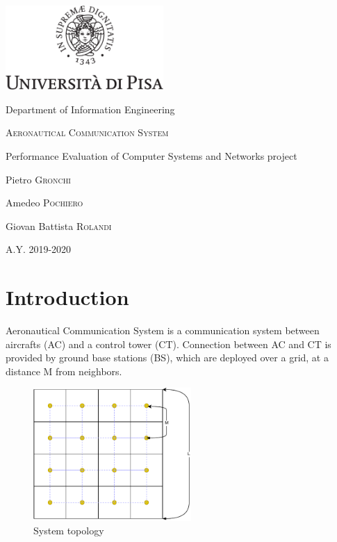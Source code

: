 \documentclass[a4paper,12pt]{article}
\newcommand{\projectname}{Aeronautical Communication System}
\begin{document}

{
  \begin{titlepage}
  	\centering
  	\includegraphics[width=6cm]{img/unipi.pdf}\par
    \vspace{1.5cm}
    {\Large Department of Information Engineering \par}
  	\vspace{1.5cm}
  	{\huge\textsc{\projectname{}}\par}
    \vspace{0.5cm}
    {\Large Performance Evaluation of Computer Systems and Networks project \par}
  	\vspace{2cm}
  	Pietro \textsc{Gronchi}\par
  	Amedeo \textsc{Pochiero}\par
    Giovan Battista \textsc{Rolandi}

  	\vfill

  	{\large A.Y. 2019-2020\par}
  \end{titlepage}
}


\clearpage
\tableofcontents
\clearpage
{}

\section{Introduction} \label{Introduction}
\projectname{} is a communication system between aircrafts (AC) and a control tower (CT).
Connection between AC and CT is provided by ground base stations (BS), which are deployed over a grid, at a distance M from neighbors.

\begin{figure}[H]
  \centering
  \includegraphics[width=6cm]{img/grid.pdf}
  \caption{System topology}
  \label{fig:grid}
\end{figure}
\end{document}

